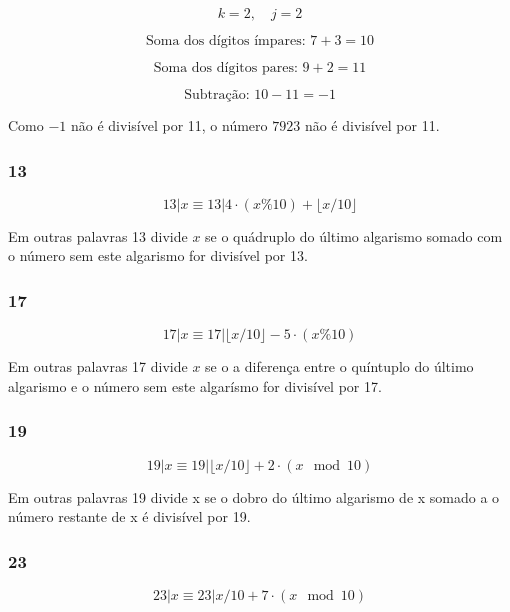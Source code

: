 \[
k = 2, \quad j = 2
\]

\[
\text{Soma dos dígitos ímpares: } 7 + 3 = 10
\]

\[
\text{Soma dos dígitos pares: } 9 + 2 = 11
\]

\[
\text{Subtração: } 10 - 11 = -1
\]

Como \(-1\) não é divisível por 11, o número \(7923\) não é divisível por 11.

\subsubsection{13}

\begin{equation}
    13 | x \equiv 13 | 4 \cdot (x\%10) + \lfloor x/10 \rfloor
\end{equation}

Em outras palavras 13 divide $x$ se o quádruplo do último algarismo somado com o número sem este algarismo for divisível por 13.

\subsubsection{17}

\begin{equation}
    17 | x \equiv 17 |  \lfloor x/10 \rfloor - 5 \cdot (x \% 10)
\end{equation}

Em outras palavras 17 divide $x$ se o a diferença entre o quíntuplo do último algarismo e o número sem este algarísmo for divisível por 17.

\subsubsection{19}

\begin{equation}
    19 | x \equiv 19 | \lfloor x / 10 \rfloor + 2 \cdot (x \mod 10)
\end{equation}

Em outras palavras 19 divide x se o dobro do último algarismo de x somado a o número restante de x é divisível por 19.

\subsubsection{23}

\begin{equation}
    23 | x \equiv 23 |  x / 10  + 7 \cdot (x \mod 10)  
\end{equation}


